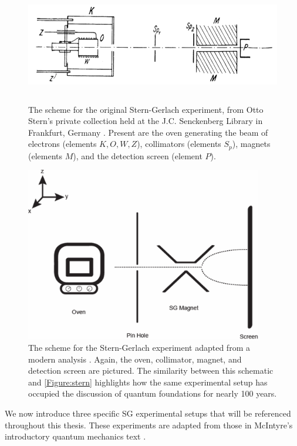 \begin{figure}[!tb]
\centering\CaptionFontSize
\includegraphics[height=2.0in]
{Figure-stern}
\caption[Insert an abbreviated caption here to show in the List of Figures]
  {The scheme for the original Stern-Gerlach experiment, from Otto Stern's private collection held at the J.C. Senckenberg Library in Frankfurt, Germany \cite{bocking}. Present are the oven generating the beam of electrons (elements $K,O,W,Z$), collimators (elements $S_p$), magnets (elements $M$), and the detection screen (element $P$).}
\label{Figure:stern}
\end{figure}

\begin{figure}[!tb]
\centering\CaptionFontSize
\includegraphics[height=3.0in]
{Figure-new-stern}
\caption[Insert an abbreviated caption here to show in the List of Figures]
  {The scheme for the Stern-Gerlach experiment adapted from a modern analysis \cite{rodriguez}. Again, the oven, collimator, magnet, and detection screen are pictured. The similarity between this schematic and \autoref{Figure:stern} highlights how the same experimental setup has occupied the discussion of quantum foundations for nearly 100 years.}
\label{Figure:new stern}
\end{figure}

We now introduce three specific SG experimental setups that will be referenced throughout this thesis. These experiments are adapted from those in McIntyre's introductory quantum mechanics text \cite{mcintyre}.
